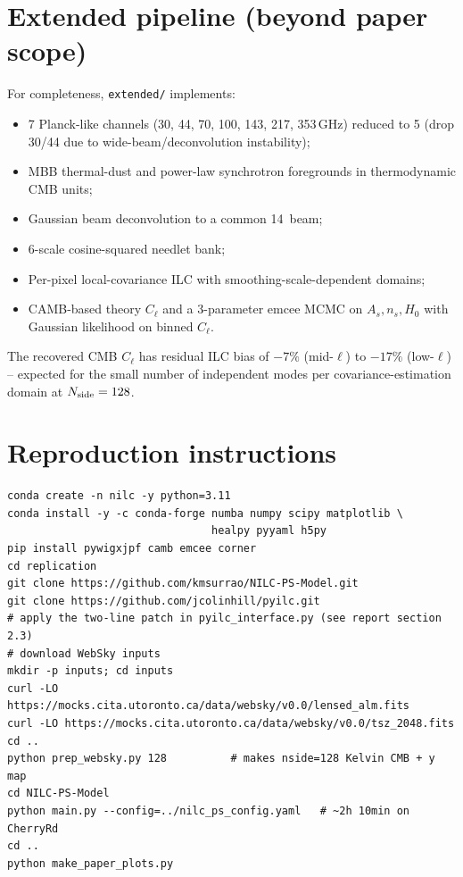 \documentclass[11pt]{article}
\begin{document}
\section{Extended pipeline (beyond paper scope)}\label{sec:extended}

For completeness, \texttt{extended/} implements:
\begin{itemize}
  \item 7 Planck-like channels (30, 44, 70, 100, 143, 217, 353\,GHz) reduced to 5 (drop 30/44 due to wide-beam/deconvolution instability);
  \item MBB thermal-dust and power-law synchrotron foregrounds in thermodynamic CMB units;
  \item Gaussian beam deconvolution to a common 14\arcmin\ beam;
  \item 6-scale cosine-squared needlet bank;
  \item Per-pixel local-covariance ILC with smoothing-scale-dependent domains;
  \item CAMB-based theory $C_\ell$ and a 3-parameter emcee MCMC on
    $A_s,n_s,H_0$ with Gaussian likelihood on binned $C_\ell$.
\end{itemize}
The recovered CMB $C_\ell$ has residual ILC bias of $-7\%$ (mid-$\ell$) to
$-17\%$ (low-$\ell$) -- expected for the small number of independent modes
per covariance-estimation domain at $N_{\rm side}=128$.

\section{Reproduction instructions}

\begin{verbatim}
conda create -n nilc -y python=3.11
conda install -y -c conda-forge numba numpy scipy matplotlib \
                                healpy pyyaml h5py
pip install pywigxjpf camb emcee corner
cd replication
git clone https://github.com/kmsurrao/NILC-PS-Model.git
git clone https://github.com/jcolinhill/pyilc.git
# apply the two-line patch in pyilc_interface.py (see report section 2.3)
# download WebSky inputs
mkdir -p inputs; cd inputs
curl -LO https://mocks.cita.utoronto.ca/data/websky/v0.0/lensed_alm.fits
curl -LO https://mocks.cita.utoronto.ca/data/websky/v0.0/tsz_2048.fits
cd ..
python prep_websky.py 128          # makes nside=128 Kelvin CMB + y map
cd NILC-PS-Model
python main.py --config=../nilc_ps_config.yaml   # ~2h 10min on CherryRd
cd ..
python make_paper_plots.py
\end{verbatim}
\end{document}
